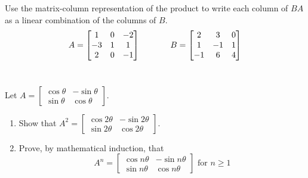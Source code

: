 \documentclass[12pt,letterpaper]{hmcpset}
\begin{document}
\begin{problem}[3.1.26]

Use the matrix-column representation of the product to write each column of $BA$ as a linear combination of the columns of $B$.\\

$$A = \begin{bmatrix}
        1 & 0 & -2 \\
        -3 & 1 & 1 \\
        2 & 0 & -1
      \end{bmatrix} \hspace{0.5in} B = \begin{bmatrix}
	2 & 3 & 0 \\
	1 & -1 & 1 \\
	-1 & 6 & 4
    \end{bmatrix}$$\\

\end{problem}

\begin{solution}
\vfill
\end{solution}
\newpage

\begin{problem}[3.1.38]

Let $A = \begin{bmatrix}
		\cos{\theta} & -\sin{\theta}\\
		\sin{\theta} & \cos{\theta}
	\end{bmatrix}$.\\
	\begin{enumerate}
		\item
			Show that $A^2 = \begin{bmatrix}
				\cos{2\theta} & -\sin{2\theta}\\
				\sin{2\theta} & \cos{2\theta}
				\end{bmatrix}$.
		\item
			Prove, by mathematical induction, that $$A^n = \begin{bmatrix}
				\cos{n\theta} & -\sin{n\theta}\\
				\sin{n\theta} & \cos{n\theta}
				\end{bmatrix} \text{ for } n \geq 1$$
	\end{enumerate}
\end{problem}

\begin{solution}
\vfill
\end{solution}
\end{document}
